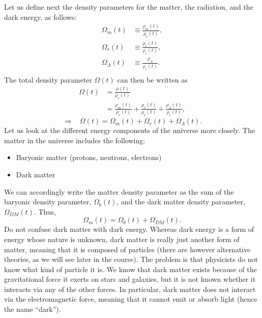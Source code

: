 \documentclass[11pt, a4paper,oneside,openright]{book}
\numberwithin{equation}{section}
\begin{document}
Let us define next the density parameters for the matter, the radiation, and the dark energy, as follows:
\begin{equation}
\begin{split}
\Omega_m(t)&\equiv \frac{\rho_m(t)}{\rho_c(t)},\\
\Omega_r(t)&\equiv \frac{\rho_r(t)}{\rho_c(t)},\\
\Omega_{\Lambda}(t)&\equiv \frac{\rho_{\Lambda}}{\rho_c(t)}.\\
\end{split}
\end{equation}
The total density parameter $\Omega(t)$ can then be written as
\begin{equation}
\begin{split}
\Omega(t)&= \frac{\rho(t)}{\rho_c(t)}\\
&=\frac{\rho_m(t)}{\rho_c(t)}+\frac{\rho_r(t)}{\rho_c(t)}+\frac{\rho_{\Lambda}(t)}{\rho_c(t)},
\end{split}
\end{equation}
\begin{equation}
\Rightarrow~~~~\Omega(t)=\Omega_m(t)+\Omega_r(t)+\Omega_{\Lambda}(t).
\end{equation}
Let us look at the different energy components of the universe more closely. The matter in the universe includes the following:
\begin{itemize}
\item Baryonic matter (protons, neutrons, electrons)
\item Dark matter
\end{itemize}
We can accordingly write the matter density parameter as the sum of the baryonic density parameter, $\Omega_b(t)$, and the dark matter density parameter, $\Omega_{DM}(t)$. Thus,
\begin{equation}
\Omega_m(t)=\Omega_b(t)+\Omega_{DM}(t).
\end{equation}
Do not confuse dark matter with dark energy. Whereas dark energy is a form of energy whose nature is unknown, dark matter is really just another form of matter, meaning that it is composed of particles (there are however alternative theories, as we will see later in the course). The problem is that physicists do not know what kind of particle it is. We know that dark matter exists because of the gravitational force it exerts on stars and galaxies, but it is not known whether it interacts via any of the other forces. In particular, dark matter does not interact via the electromagnetic force, meaning that it cannot emit or absorb light (hence the name ``dark'').
\end{document}
